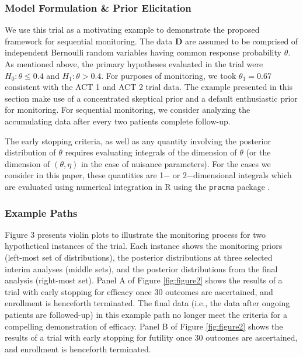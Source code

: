 \documentclass[12pt]{article}
\begin{document}
\subsubsection{Model Formulation \& Prior Elicitation}\label{sec:example1model} We use this trial as a motivating example to demonstrate the proposed 
framework for sequential monitoring. The data $\mathbf{D}$ are assumed to be comprised of independent Bernoulli random variables having common response 
probability $\theta$. 
%
As mentioned above, the primary hypotheses evaluated in the trial were $H_0:\theta \le 0.4$ and $H_1: \theta>0.4$.
%
For purposes of monitoring, we took $\theta_1=0.67$ consistent with the ACT 1 and ACT 2 trial data. 
%
The example presented in this section make use of a concentrated skeptical prior and a default enthusiastic prior for monitoring.
%
%
%
For sequential monitoring, we consider analyzing the accumulating data after every two patients complete follow-up.

The early stopping criteria, as well as any quantity involving the posterior distribution of $\theta$ requires evaluating integrals of the dimension of $\theta$ (or the dimension of $(\theta,\eta)$ in the case of nuisance parameters).
%
For the cases we consider in this paper, these quantities are 1$-$ or 2$-$dimensional integrals which are evaluated using numerical integration in R \citep{R2017} using the \texttt{pracma} package \citep{Borchers2019}.

\subsubsection{Example Paths}
Figure 3 presents violin plots to illustrate the monitoring process for two hypothetical instances of the trial. 
%
Each instance shows the monitoring priors (left-most set of distributions), the posterior distributions at three selected interim analyses (middle sets), and the posterior distributions from the final analysis (right-most set).
Panel A of Figure \ref{fig:figure2} shows the results of a trial with early stopping for efficacy once 30 outcomes are ascertained, and enrollment is henceforth terminated. 
%
The final data (i.e., the data after ongoing patients are followed-up) in this example path no longer meet the criteria for a compelling demonstration of efficacy.
%
Panel B of Figure \ref{fig:figure2} shows the results of a trial with early stopping for futility once 30 outcomes are ascertained, and enrollment is henceforth terminated. %
\end{document}
